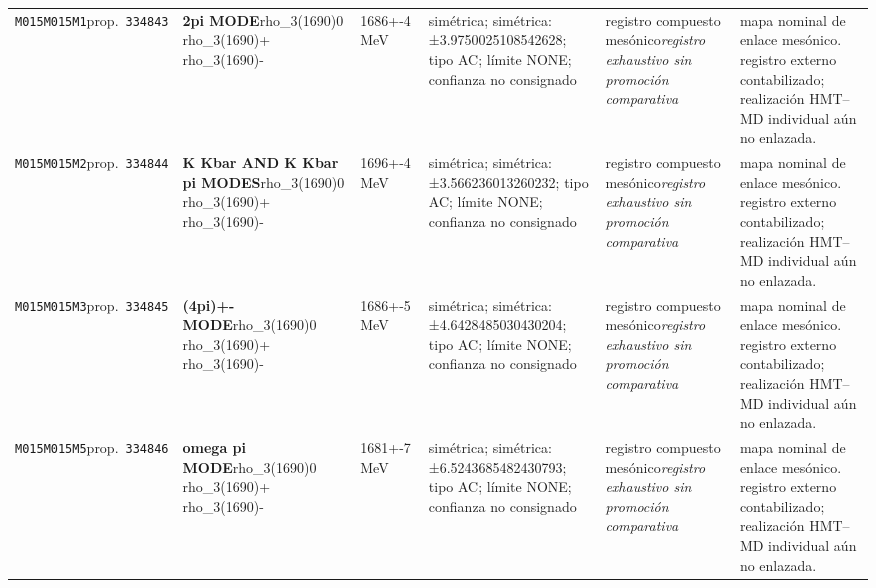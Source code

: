 \begin{landscape}
\begin{longtable}{L{1.85cm}L{4.45cm}L{2.35cm}L{4.05cm}L{3.35cm}L{7.15cm}}
\texttt{M015}\newline \texttt{M015M1}\newline prop.\ \texttt{334843} & \textbf{2pi MODE}\newline rho\_\allowbreak{}3(1690)0 \textbar{}\allowbreak{} rho\_\allowbreak{}3(1690)+ \textbar{}\allowbreak{} rho\_\allowbreak{}3(1690)- & 1686+-4\,MeV & simétrica; simétrica: ±3.9750025108542628; tipo AC; límite NONE; confianza no consignado & registro compuesto mesónico\newline \emph{registro exhaustivo sin promoción comparativa} & mapa nominal de enlace mesónico. registro externo contabilizado; realización HMT--MD individual aún no enlazada. \\
\texttt{M015}\newline \texttt{M015M2}\newline prop.\ \texttt{334844} & \textbf{K Kbar AND K Kbar pi MODES}\newline rho\_\allowbreak{}3(1690)0 \textbar{}\allowbreak{} rho\_\allowbreak{}3(1690)+ \textbar{}\allowbreak{} rho\_\allowbreak{}3(1690)- & 1696+-4\,MeV & simétrica; simétrica: ±3.566236013260232; tipo AC; límite NONE; confianza no consignado & registro compuesto mesónico\newline \emph{registro exhaustivo sin promoción comparativa} & mapa nominal de enlace mesónico. registro externo contabilizado; realización HMT--MD individual aún no enlazada. \\
\texttt{M015}\newline \texttt{M015M3}\newline prop.\ \texttt{334845} & \textbf{(4pi)+- MODE}\newline rho\_\allowbreak{}3(1690)0 \textbar{}\allowbreak{} rho\_\allowbreak{}3(1690)+ \textbar{}\allowbreak{} rho\_\allowbreak{}3(1690)- & 1686+-5\,MeV & simétrica; simétrica: ±4.6428485030430204; tipo AC; límite NONE; confianza no consignado & registro compuesto mesónico\newline \emph{registro exhaustivo sin promoción comparativa} & mapa nominal de enlace mesónico. registro externo contabilizado; realización HMT--MD individual aún no enlazada. \\
\texttt{M015}\newline \texttt{M015M5}\newline prop.\ \texttt{334846} & \textbf{omega pi MODE}\newline rho\_\allowbreak{}3(1690)0 \textbar{}\allowbreak{} rho\_\allowbreak{}3(1690)+ \textbar{}\allowbreak{} rho\_\allowbreak{}3(1690)- & 1681+-7\,MeV & simétrica; simétrica: ±6.5243685482430793; tipo AC; límite NONE; confianza no consignado & registro compuesto mesónico\newline \emph{registro exhaustivo sin promoción comparativa} & mapa nominal de enlace mesónico. registro externo contabilizado; realización HMT--MD individual aún no enlazada. \\

\end{longtable}
\end{landscape}
